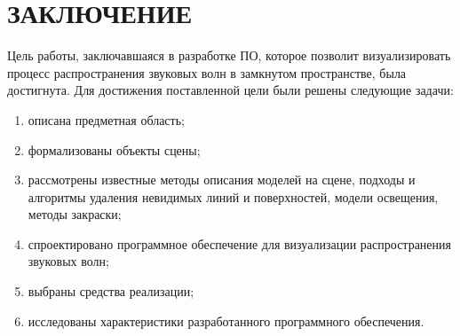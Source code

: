 \chapter*{ЗАКЛЮЧЕНИЕ}

Цель работы, заключавшаяся в разработке ПО, которое позволит визуализировать процесс распространения звуковых волн в замкнутом пространстве, была достигнута.
Для достижения поставленной цели были решены следующие задачи:
\begin{enumerate}
	\item описана предметная область;
	\item формализованы объекты сцены;
	\item рассмотрены известные методы описания моделей на сцене, подходы и алгоритмы удаления невидимых линий и поверхностей, модели освещения, методы закраски;
	\item спроектировано программное обеспечение для визуализации распространения звуковых волн;
	\item выбраны средства реализации;
	\item исследованы характеристики разработанного программного обеспечения.
\end{enumerate}